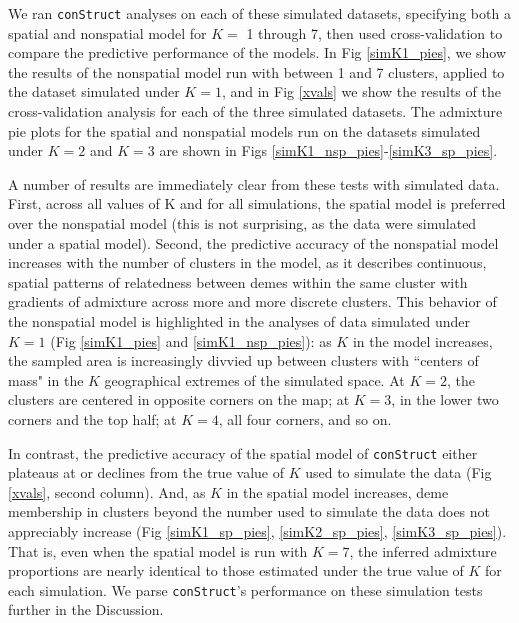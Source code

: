 \documentclass[12pt]{article}
\begin{document}
We ran \texttt{conStruct} analyses on each of these simulated datasets, 
specifying both a spatial and nonspatial model for $K = $ 1 through 7, 
then used cross-validation to compare the predictive performance of the models.
In Fig \ref{simK1_pies}, we show the results of the nonspatial model 
run with between 1 and 7 clusters, applied to the dataset simulated under $K=1$,
and in Fig \ref{xvals} we show the results of the cross-validation analysis for each of the three simulated datasets.
The admixture pie plots for the spatial and nonspatial models run on the datasets simulated under $K=2$ and $K=3$
are shown in Figs \ref{simK1_nsp_pies}-\ref{simK3_sp_pies}.

A number of results are immediately clear from these tests with simulated data.
First, across all values of K and for all simulations, 
the spatial model is preferred over the nonspatial model
(this is not surprising, as the data were simulated under a spatial model).
Second, the predictive accuracy of the nonspatial model increases with the number of clusters in the model, 
as it describes continuous, spatial patterns of relatedness between demes within the same cluster 
with gradients of admixture across more and more discrete clusters.
This behavior of the nonspatial model is highlighted in the analyses of data simulated under $K=1$ (Fig \ref{simK1_pies} and \ref{simK1_nsp_pies}):
as $K$ in the model increases, 
the sampled area is increasingly divvied up between clusters 
with ``centers of mass" in the $K$ geographical extremes of the simulated space.
At $K=2$, the clusters are centered in opposite corners on the map; 
at $K=3$, in the lower two corners and the top half; 
at $K=4$, all four corners, and so on.

In contrast, the predictive accuracy of the spatial model of \texttt{conStruct} 
either plateaus at or declines from the true value of $K$ used to simulate the data (Fig \ref{xvals}, second column).
And, as $K$ in the spatial model increases, 
deme membership in clusters beyond the number used to simulate the data does not appreciably increase 
(Fig \ref{simK1_sp_pies}, \ref{simK2_sp_pies}, \ref{simK3_sp_pies}).
That is, even when the spatial model is run with $K=7$, 
the inferred admixture proportions are nearly identical to 
those estimated under the true value of $K$ for each simulation.
We parse \texttt{conStruct}'s performance on these simulation tests further in the Discussion.
\end{document}
